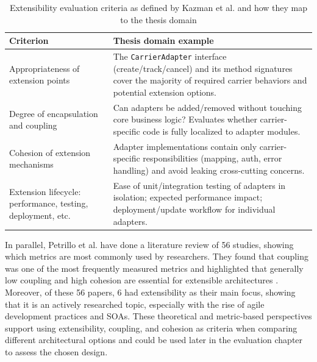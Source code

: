 \documentclass{imc-inf}
\begin{document}
\begin{table}[!htbp]
  \centering
  \begin{tabular}{@{}>{\raggedright\arraybackslash}p{6cm}p{9cm}@{}}
    \toprule
    \textbf{Criterion}                                          & \textbf{Thesis domain example}                                                                            \\
    \midrule
    Appropriateness of extension points                         &
    The \texttt{CarrierAdapter} interface (create/track/cancel) and its method signatures cover the majority of required carrier behaviors and potential extension options. \\[6pt]
    Degree of encapsulation and coupling                        &
    Can adapters be added/removed without touching core business logic? Evaluates whether carrier-specific code is fully localized to adapter modules.                      \\[6pt]
    Cohesion of extension mechanisms                            &
    Adapter implementations contain only carrier-specific responsibilities (mapping, auth, error handling) and avoid leaking cross-cutting concerns.                        \\[6pt]
    Extension lifecycle: performance, testing, deployment, etc. &
    Ease of unit/integration testing of adapters in isolation; expected performance impact; deployment/update workflow for individual adapters.                             \\
    \bottomrule
  \end{tabular}
  \caption{Extensibility evaluation criteria as defined by Kazman et al. \cite{kazmanExtensibility2022} and how they map to the thesis domain}
  \label{tab:extensibility-criteria}
\end{table}

In parallel, Petrillo et al. have done a literature review of 56 studies, showing which metrics are most commonly used by researchers.
They found that coupling was one of the most frequently measured metrics and highlighted that generally low coupling and high cohesion are essential for extensible architectures \cite{coulinSoftwareArchitectureMetrics2019}.
Moreover, of these 56 papers, 6 had extensibility as their main focus, showing that it is an actively researched topic, especially with the rise of agile development practices and SOAs.
These theoretical and metric-based perspectives support using extensibility, coupling, and cohesion as criteria when comparing different architectural options and could be used later in the evaluation chapter to assess the chosen design.
\end{document}
